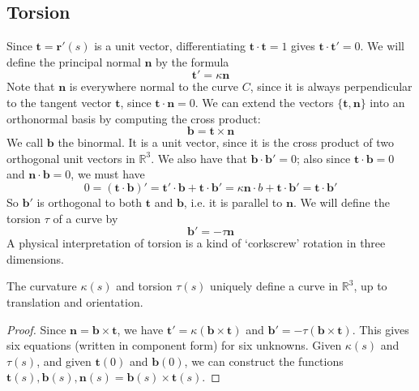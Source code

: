 \documentclass{article}
\begin{document}
\subsection{Torsion}
Since $\bm t = \bm r'(s)$ is a unit vector, differentiating $\bm t \cdot \bm t = 1$ gives $\bm t \cdot \bm t' = 0$. We will define the principal normal $\bm n$ by the formula
\[ \bm t' = \kappa \bm n \]
Note that $\bm n$ is everywhere normal to the curve $C$, since it is always perpendicular to the tangent vector $\bm t$, since $\bm t \cdot \bm n = 0$. We can extend the vectors $\{ \bm t, \bm n \}$ into an orthonormal basis by computing the cross product:
\[ \bm b = \bm t \times \bm n \]
We call $\bm b$ the binormal. It is a unit vector, since it is the cross product of two orthogonal unit vectors in $\mathbb R^3$. We also have that $\bm b \cdot \bm b' = 0$; also since $\bm t \cdot \bm b = 0$ and $\bm n \cdot \bm b = 0$, we must have
\[ 0 = (\bm t \cdot \bm b)' = \bm t' \cdot \bm b + \bm t \cdot \bm b' = \kappa \bm n \cdot b + \bm t \cdot \bm b' = \bm t \cdot \bm b' \]
So $\bm b'$ is orthogonal to both $\bm t$ and $\bm b$, i.e. it is parallel to $\bm n$. We will define the torsion $\tau$ of a curve by
\[ \bm b' = -\tau \bm n \]
A physical interpretation of torsion is a kind of `corkscrew' rotation in three dimensions.

\begin{proposition}
    The curvature $\kappa(s)$ and torsion $\tau(s)$ uniquely define a curve in $\mathbb R^3$, up to translation and orientation.
\end{proposition}
\begin{proof}
    Since $\bm n = \bm b \times \bm t$, we have $\bm t' = \kappa(\bm b \times \bm t)$ and $\bm b' = -\tau(\bm b \times \bm t)$. This gives six equations (written in component form) for six unknowns. Given $\kappa(s)$ and $\tau(s)$, and given $\bm t(0)$ and $\bm b(0)$, we can construct the functions $\bm t(s), \bm b(s), \bm n(s) = \bm b(s) \times \bm t(s)$.
\end{proof}
\end{document}
